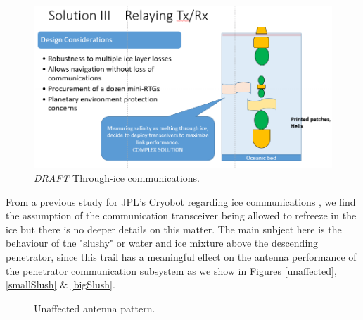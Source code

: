 \begin{figure}[htb]
	\centering
	\includegraphics[width=\textwidth]{figures/comms/iceLink-relay}
	\caption{\textit{DRAFT} Through-ice communications.}
	\label{fig:through-ice_comms}
\end{figure}




From a previous study for JPL's Cryobot regarding ice communications \cite{iceLink-scott}, we find the assumption of the communication transceiver being allowed to refreeze in the ice but there is no deeper details on this matter. The main subject here is the behaviour of the "slushy" or water and ice mixture above the descending penetrator, since this trail has a meaningful effect on the antenna performance of the penetrator communication subsystem as we show in Figures \ref{unaffected}, \ref{smallSlush} \& \ref{bigSlush}.

\begin{figure}[htb]
	\centering
	\caption{Unaffected antenna pattern.}
	\label{fig:unaffected}
\end{figure}

